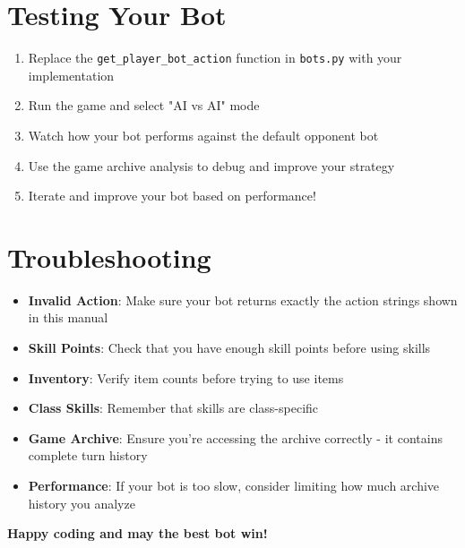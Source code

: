 \documentclass[12pt]{article}
\begin{document}
\section{Testing Your Bot}
\label{sec:testing}

\begin{enumerate}
    \item Replace the \texttt{get\_player\_bot\_action} function in \texttt{bots.py} with your implementation
    \item Run the game and select "AI vs AI" mode
    \item Watch how your bot performs against the default opponent bot
    \item Use the game archive analysis to debug and improve your strategy
    \item Iterate and improve your bot based on performance!
\end{enumerate}

\section{Troubleshooting}
\label{sec:troubleshooting}

\begin{itemize}
    \item \textbf{Invalid Action}: Make sure your bot returns exactly the action strings shown in this manual
    \item \textbf{Skill Points}: Check that you have enough skill points before using skills
    \item \textbf{Inventory}: Verify item counts before trying to use items
    \item \textbf{Class Skills}: Remember that skills are class-specific
    \item \textbf{Game Archive}: Ensure you're accessing the archive correctly - it contains complete turn history
    \item \textbf{Performance}: If your bot is too slow, consider limiting how much archive history you analyze
\end{itemize}

\begin{center}
\Large\textbf{Happy coding and may the best bot win!}
\end{center}
\end{document}
